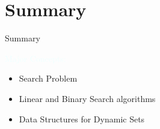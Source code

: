 \documentclass{beamer}
\newcommand{\tblue}[1]{{\Large {\textcolor{azure}{#1}}}}
\begin{document}
\section{Summary}
\begin{frame}{Summary}

\tblue{Major Concepts:}
\begin{itemize}
\item Search Problem
\item Linear and Binary Search algorithms
\item Data Structures for Dynamic Sets
\end{itemize}
\end{frame}
\end{document}
